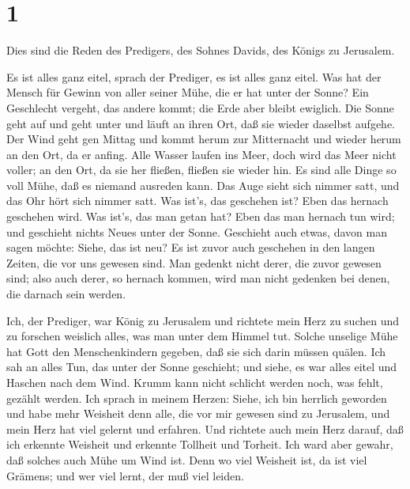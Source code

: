 \hypertarget{section}{%
\section{1}\label{section}}

 Dies sind die Reden des Predigers, des Sohnes Davids, des
Königs zu Jerusalem.

 Es ist alles ganz eitel, sprach der Prediger, es ist alles
ganz eitel.  Was hat der Mensch für Gewinn von aller seiner
Mühe, die er hat unter der Sonne?  Ein Geschlecht vergeht,
das andere kommt; die Erde aber bleibt ewiglich.  Die Sonne
geht auf und geht unter und läuft an ihren Ort, daß sie wieder daselbst
aufgehe.  Der Wind geht gen Mittag und kommt herum zur
Mitternacht und wieder herum an den Ort, da er anfing.  Alle
Wasser laufen ins Meer, doch wird das Meer nicht voller; an den Ort, da
sie her fließen, fließen sie wieder hin.  Es sind alle Dinge
so voll Mühe, daß es niemand ausreden kann. Das Auge sieht sich nimmer
satt, und das Ohr hört sich nimmer satt.  Was ist's, das
geschehen ist? Eben das hernach geschehen wird. Was ist's, das man getan
hat? Eben das man hernach tun wird; und geschieht nichts Neues unter der
Sonne.  Geschieht auch etwas, davon man sagen möchte:
Siehe, das ist neu? Es ist zuvor auch geschehen in den langen Zeiten,
die vor uns gewesen sind.  Man gedenkt nicht derer, die
zuvor gewesen sind; also auch derer, so hernach kommen, wird man nicht
gedenken bei denen, die darnach sein werden.

 Ich, der Prediger, war König zu Jerusalem 
und richtete mein Herz zu suchen und zu forschen weislich alles, was man
unter dem Himmel tut. Solche unselige Mühe hat Gott den Menschenkindern
gegeben, daß sie sich darin müssen quälen.  Ich sah an
alles Tun, das unter der Sonne geschieht; und siehe, es war alles eitel
und Haschen nach dem Wind.  Krumm kann nicht schlicht
werden noch, was fehlt, gezählt werden.  Ich sprach in
meinem Herzen: Siehe, ich bin herrlich geworden und habe mehr Weisheit
denn alle, die vor mir gewesen sind zu Jerusalem, und mein Herz hat viel
gelernt und erfahren.  Und richtete auch mein Herz darauf,
daß ich erkennte Weisheit und erkennte Tollheit und Torheit. Ich ward
aber gewahr, daß solches auch Mühe um Wind ist.  Denn wo
viel Weisheit ist, da ist viel Grämens; und wer viel lernt, der muß viel
leiden.

